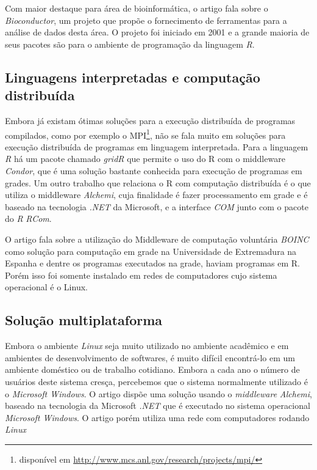 Com maior destaque para área de bioinformática, o artigo 
\cite{bioconductor} fala sobre o \emph{Bioconductor}, um projeto  que propõe o fornecimento 
de ferramentas para a análise de dados desta área. O projeto foi iniciado em 2001 e a grande maioria de 
seus pacotes são para o ambiente de programação da linguagem \emph{R}.

\subsection{Linguagens interpretadas e computação distribuída}

Embora já existam ótimas soluções para a execução distribuída de programas compilados, como por exemplo o
 MPI\footnote{disponível em \url{http://www.mcs.anl.gov/research/projects/mpi/}}, não se fala muito em soluções 
para execução distribuída de programas em linguagem interpretada. 
Para a linguagem \emph{R} há um pacote chamado \emph{gridR} que permite o uso do R com o middleware \emph{Condor}, %
que é uma solução bastante conhecida para execução de programas em grades.  
Um outro trabalho que relaciona o R com computação distribuída é o \cite{Dias} que 
utiliza o middleware \emph{Alchemi}, cuja finalidade é fazer processamento em grade e é baseado na 
tecnologia \textit{.NET} da Microsoft,  e a interface \textit{COM} junto com o pacote do \emph{R}
\emph{RCom}.  

O artigo \cite{boinc} fala sobre a utilização do Middleware de computação voluntária \emph{BOINC} como solução para computação 
em grade na Universidade de Extremadura na Espanha e dentre os programas executados na grade, haviam
programas em R. Porém isso foi somente instalado em redes de computadores cujo sistema
operacional é o Linux. 


\subsection{Solução multiplataforma}

Embora o ambiente \emph{Linux} seja muito utilizado no ambiente acadêmico e em ambientes de desenvolvimento de softwares, é
muito difícil encontrá-lo em um ambiente doméstico ou de trabalho cotidiano. Embora a cada ano o número de usuários deste 
sistema cresça, percebemos que o sistema normalmente utilizado é o \emph{Microsoft Windows}. O artigo \cite{Dias}
dispõe uma solução usando o \emph{middleware} \emph{Alchemi}, baseado na tecnologia da Microsoft \emph{.NET} que é executado
no sistema operacional \emph{Microsoft Windows}. O artigo \cite{boinc} porém utiliza uma rede com computadores rodando \emph{Linux}

